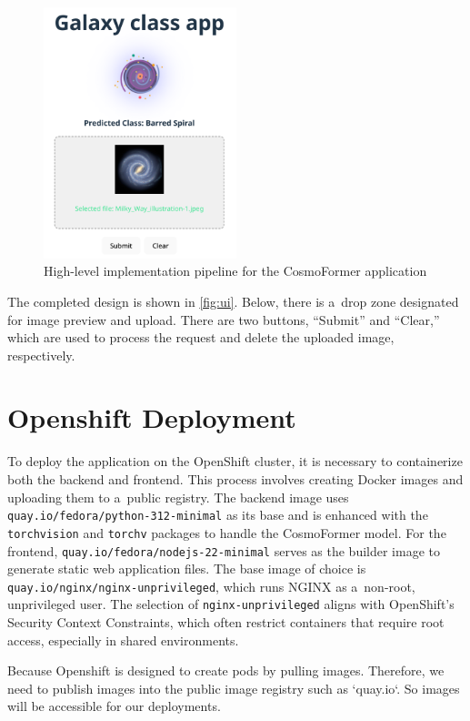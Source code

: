 \begin{figure}[htbp]
  \centering
  \includegraphics[width=0.5\textwidth]{obrazky-figures/05-implementation/ui.png}
  \caption{High-level implementation pipeline for the CosmoFormer application}
  \label{fig:ui}
\end{figure}

The completed design is shown in \autoref{fig:ui}. Below, there is a~drop zone designated for image preview and upload. There are two buttons, “Submit” and “Clear,” which are used to process the request and delete the uploaded image, respectively.

\section{Openshift Deployment}

To deploy the application on the OpenShift cluster, it is necessary to containerize both the backend and frontend. This process involves creating Docker images and uploading them to a~public registry. The backend image uses \texttt{quay.io/fedora/python-312-minimal} as its base and is enhanced with the \texttt{torchvision} and \texttt{torchv} packages to handle the CosmoFormer model. For the frontend, \texttt{quay.io/fedora/nodejs-22-minimal} serves as the builder image to generate static web application files. The base image of choice is \texttt{quay.io/nginx/nginx-unprivileged}, which runs NGINX as a~non-root, unprivileged user. The selection of \texttt{nginx-unprivileged} aligns with OpenShift’s Security Context Constraints, which often restrict containers that require root access, especially in shared environments.

Because Openshift is designed to create pods by pulling images. Therefore, we need to publish images into the public image registry such as `quay.io`. So images will be accessible for our deployments.

